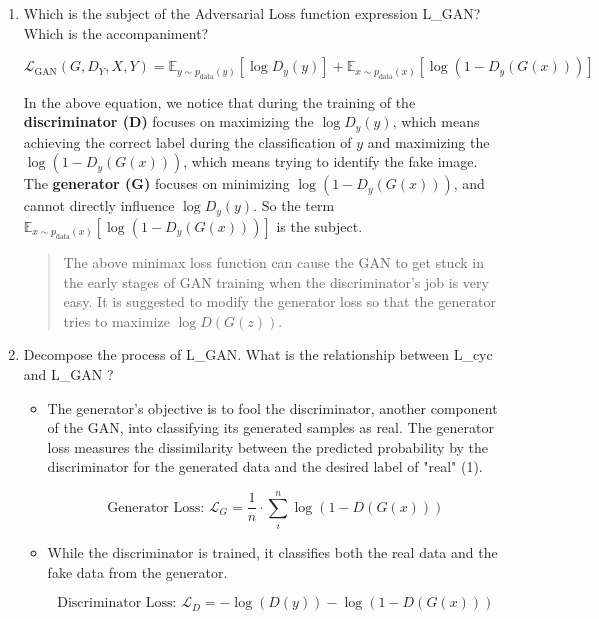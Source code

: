 \documentclass[
]{article}
\begin{document}
\begin{enumerate}
\def\labelenumi{\arabic{enumi}.}
\item
  Which is the subject of the Adversarial Loss function expression
  L\_GAN? Which is the accompaniment?

  \[\mathcal{L}_{\text{GAN}}(G,D_Y,X,Y)=\mathbb{E}_{y\sim p_{\text{data}}(y)}[\log{D_y(y)}]+\mathbb{E}_{x\sim p_{\text{data}}(x)}[\log{(1-D_y(G(x)))}]\]

  In the above equation, we notice that during the training of the
  \textbf{discriminator (D)} focuses on maximizing the \(\log{D_y(y)}\),
  which means achieving the correct label during the classification of
  \(y\) and maximizing the \(\log{(1-D_y(G(x)))}\), which means trying
  to identify the fake image. The \textbf{generator (G)} focuses on
  minimizing \(\log{(1-D_y(G(x)))}\), and cannot directly influence
  \(\log{D_y(y)}\). So the term
  \(\mathbb{E}_{x\sim p_{\text{data}}(x)}[\log{(1-D_y(G(x)))}]\) is the
  subject.

  \begin{quote}
  The above minimax loss function can cause the GAN to get stuck in the
  early stages of GAN training when the discriminator's job is very
  easy. It is suggested to modify the generator loss so that the
  generator tries to maximize \(\log D(G(z))\).
  \end{quote}
\item
  Decompose the process of L\_GAN. What is the relationship between
  L\_cyc and L\_GAN ?

  \begin{itemize}
  \item
    The generator's objective is to fool the discriminator, another
    component of the GAN, into classifying its generated samples as
    real. The generator loss measures the dissimilarity between the
    predicted probability by the discriminator for the generated data
    and the desired label of "real" (1).

    \[\text{Generator Loss: } \mathcal{L}_G = \frac{1}{n}\cdot\sum_i^n \log{(1-D(G(x)))}\]
  \item
    While the discriminator is trained, it classifies both the real data
    and the fake data from the generator.

    \[\text{Discriminator Loss: } \mathcal{L}_D= -\log(D(y)) - \log(1 - D(G(x)))\]


\end{itemize}
\end{enumerate}
\end{document}
